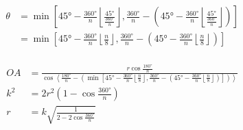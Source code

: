 \documentclass[12pt]{scrartcl}
\begin{document}
\begin{align*}
	\theta & = \min\left[\ang{45} - \frac{\ang{360}}{n}\left\lfloor \frac{\ang{45}}{\frac{\ang{360}}{n}} \right\rfloor, \frac{\ang{360}}{n} - \left(\ang{45} - \frac{\ang{360}}{n}\left\lfloor \frac{\ang{45}}{\frac{\ang{360}}{n}} \right\rfloor\right)\right] \\
	       & = \min\left[\ang{45} - \frac{\ang{360}}{n}\left\lfloor \frac{n}{8} \right\rfloor, \frac{\ang{360}}{n} - \left(\ang{45} - \frac{\ang{360}}{n}\left\lfloor \frac{n}{8}\right\rfloor\right)\right]                                                    \\
\end{align*}

\begin{align*}
	OA  & = \frac{r \cos \frac{\ang{180}}{n}}{\cos \left\langle\frac{\ang{180}}{n} - \left(\min\left[\ang{45} - \frac{\ang{360}}{n}\left\lfloor \frac{n}{8} \right\rfloor, \frac{\ang{360}}{n} - \left(\ang{45} - \frac{\ang{360}}{n}\left\lfloor \frac{n}{8}\right \rfloor\right)\right]\right)\right\rangle} \\
	k^2 & = 2r^2 \left(1 - \cos \frac{\ang{360}}{n}\right)                                                                                                                                                                                                                                                     \\
	r   & = k\sqrt{\frac{1}{2 - 2\cos\frac{\ang{360}}{n}}}                                                                                                                                                                                                                                                     \\
\end{align*}
\end{document}

